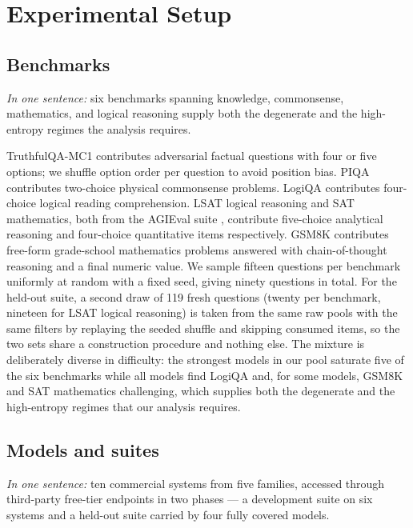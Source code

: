 \section{Experimental Setup}
\label{sec:setup}

\subsection{Benchmarks}

\emph{In one sentence:} six benchmarks spanning knowledge, commonsense, mathematics, and logical reasoning supply both the degenerate and the high-entropy regimes the analysis requires.

TruthfulQA-MC1 \citep{lin2022truthfulqa} contributes adversarial factual questions with four or five options; we shuffle option order per question to avoid position bias. PIQA \citep{bisk2020piqa} contributes two-choice physical commonsense problems. LogiQA \citep{liu2020logiqa} contributes four-choice logical reading comprehension. LSAT logical reasoning and SAT mathematics, both from the AGIEval suite \citep{zhong2023agieval}, contribute five-choice analytical reasoning and four-choice quantitative items respectively. GSM8K \citep{cobbe2021training} contributes free-form grade-school mathematics problems answered with chain-of-thought reasoning and a final numeric value. We sample fifteen questions per benchmark uniformly at random with a fixed seed, giving ninety questions in total. For the held-out suite, a second draw of 119 fresh questions (twenty per benchmark, nineteen for LSAT logical reasoning) is taken from the same raw pools with the same filters by replaying the seeded shuffle and skipping consumed items, so the two sets share a construction procedure and nothing else. The mixture is deliberately diverse in difficulty: the strongest models in our pool saturate five of the six benchmarks while all models find LogiQA and, for some models, GSM8K and SAT mathematics challenging, which supplies both the degenerate and the high-entropy regimes that our analysis requires.

\subsection{Models and suites}

\emph{In one sentence:} ten commercial systems from five families, accessed through third-party free-tier endpoints in two phases --- a development suite on six systems and a held-out suite carried by four fully covered models.


